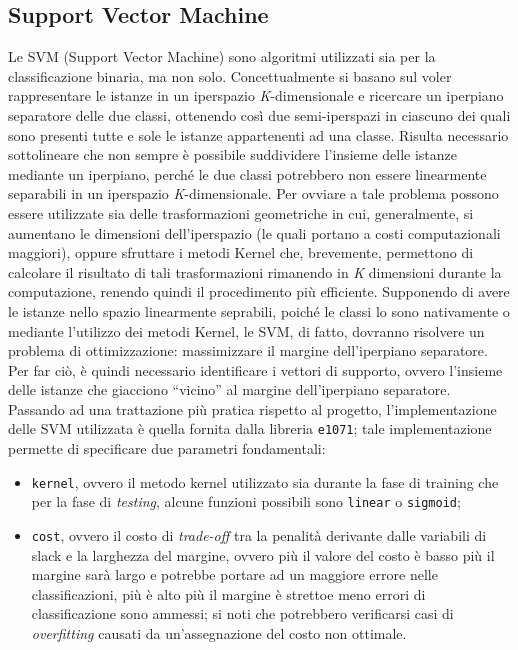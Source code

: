 \subsection{Support Vector Machine}
Le SVM (Support Vector Machine) sono algoritmi utilizzati sia per la classificazione binaria, ma non solo. 
Concettualmente si basano sul voler rappresentare le istanze in un iperspazio \textit{K}-dimensionale e ricercare un iperpiano separatore delle due classi, ottenendo così due semi-iperspazi in ciascuno dei quali sono presenti tutte e sole le istanze appartenenti ad una classe.
Risulta necessario sottolineare che non sempre è possibile suddividere l'insieme delle istanze mediante un iperpiano, perché le due classi potrebbero non essere linearmente separabili in un iperspazio \textit{K}-dimensionale.
Per ovviare a tale problema possono essere utilizzate sia delle trasformazioni geometriche in cui, generalmente, si aumentano le dimensioni dell'iperspazio (le quali portano a costi computazionali maggiori), oppure sfruttare i metodi Kernel che, brevemente, permettono di calcolare il risultato di tali trasformazioni rimanendo in \textit{K} dimensioni durante la computazione, renendo quindi il procedimento più efficiente.
Supponendo di avere le istanze nello spazio linearmente seprabili, poiché le classi lo sono nativamente o mediante l'utilizzo dei metodi Kernel, le SVM, di fatto, dovranno risolvere un problema di ottimizzazione: massimizzare il margine dell'iperpiano separatore.
Per far ciò, è quindi necessario identificare i vettori di supporto, ovvero l'insieme delle istanze che giacciono “vicino” al margine dell'iperpiano separatore.\\
Passando ad una trattazione più pratica rispetto al progetto, l'implementazione delle SVM utilizzata è quella fornita dalla libreria \texttt{e1071}; tale implementazione permette di specificare due parametri fondamentali:\begin{itemize}
	\item \texttt{kernel}, ovvero il metodo kernel utilizzato sia durante la fase di training che per la fase di \textit{testing}, alcune funzioni possibili sono \texttt{linear} o \texttt{sigmoid};
	\item \texttt{cost}, ovvero il costo di \textit{trade-off} tra la penalità derivante dalle variabili di slack e la larghezza del margine, ovvero più il valore del costo è basso più il margine sarà largo e potrebbe portare ad un maggiore errore nelle classificazioni, più è alto più il margine è strettoe meno errori di classificazione sono ammessi; si noti che potrebbero verificarsi casi di \textit{overfitting} causati da un'assegnazione del costo non ottimale. 
\end{itemize}
